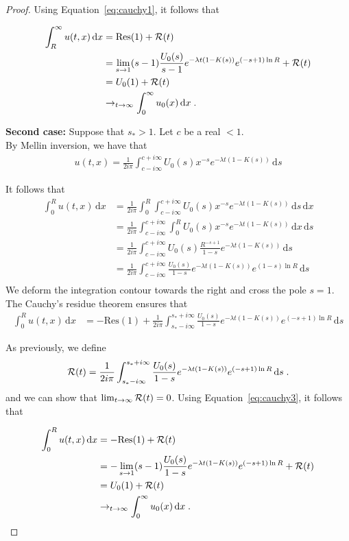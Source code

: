 \documentclass[11pt]{amsart}
\newcommand{\diff}{\,\mathrm{d}}
\begin{document}
\begin{proof}
Using Equation~\ref{eq:cauchy1}, it follows that 

\begin{align*}
    \int_R^\infty u(t,x) \diff x &= \mathrm{Res(1)} + \Rcal(t) \\
    &= \lim_{s \to 1} (s-1)\frac{U_0(s)}{s-1} e^{-\lambda t(1 - K(s))} e^{(-s+1)\ln R}  + \Rcal(t)\\
    &= U_0(1) + \Rcal(t)\\
    &\to_{t \to \infty} \int_0^\infty u_0(x) \diff x
    \eqfinp
\end{align*}

\textbf{Second case:} Suppose that $s_* > 1$. Let $c$ be a real $<1$. \\
By Mellin inversion, we have that
\begin{align*}
    u(t,x) = \frac{1}{2i\pi}\int_{c-i\infty}^{c+i\infty} U_0(s) x^{-s} e^{-\lambda t(1 - K(s))} \diff s
\end{align*}

It follows that
\begin{align*}
    \int_0^R u(t,x) \diff x 
    &= \frac{1}{2i\pi} \int_0^R \int_{c-i\infty}^{c+i\infty} U_0(s) x^{-s} e^{-\lambda t(1 - K(s))} \diff s \diff x \\
    &= \frac{1}{2i\pi} \int_{c-i\infty}^{c+i\infty} \int_0^R U_0(s) x^{-s} e^{-\lambda t(1 - K(s))} \diff x \diff s \\
    &= \frac{1}{2i\pi} \int_{c-i\infty}^{c+i\infty} U_0(s) \frac{R^{-s+1}}{1-s} e^{-\lambda t(1 - K(s))} \diff s \\
    &= \frac{1}{2i\pi} \int_{c-i\infty}^{c+i\infty} \frac{U_0(s)}{1-s} e^{-\lambda t(1 - K(s))} e^{(1-s)\ln R} \diff s \\
\end{align*}
We deform the integration contour towards the right and cross the pole $s = 1$. The Cauchy's residue theorem ensures that
\begin{align}
    \int_0^R u(t,x) \diff x &= -\mathrm{Res(1)} + \frac{1}{2i\pi} \int_{s_*-i\infty}^{s_*+i\infty} \frac{U_0(s)}{1-s} e^{-\lambda t(1 - K(s))} e^{(-s+1)\ln R} \diff s
    \label{eq:cauchy3}
\end{align}

As previously, we define
\begin{align*}
    \Rcal(t) = \frac{1}{2i\pi} \int_{s_*-i\infty}^{s_*+i\infty} \frac{U_0(s)}{1-s} e^{-\lambda t(1 - K(s))} e^{(-s+1)\ln R} \diff s
    \eqfinp
\end{align*}
and we can show that $\lim_{t\to\infty}\mathcal{R}(t) = 0$. Using Equation~\ref{eq:cauchy3}, it follows that 

\begin{align*}
    \int_0^R u(t,x) \diff x &= -\mathrm{Res(1)} + \Rcal(t) \\
    &= -\lim_{s \to 1} (s-1)\frac{U_0(s)}{1-s} e^{-\lambda t(1 - K(s))} e^{(-s+1)\ln R}  + \Rcal(t)\\
    &= U_0(1) + \Rcal(t)\\
    &\to_{t \to \infty} \int_0^\infty u_0(x) \diff x
    \eqfinp
\end{align*}
\end{proof}
\end{document}
